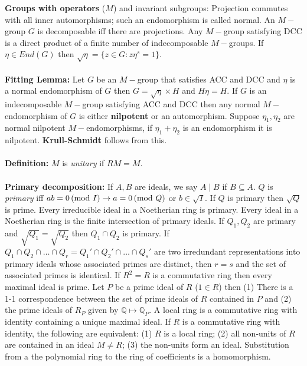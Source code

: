 {\bf Groups with operators} ($M$) and invariant subgroups:  Projection commutes with
all inner automorphisms; such an endomorphism is called normal.  An $M-$group
$G$ is decomposable 
iff there are projections.  Any $M-$group satisfying DCC is a direct
product of a finite number of indecomposable $M-$groups.  If $\eta \in  End(G)$
then ${\sqrt \eta}= \{z \in G: z \eta^s=1 \}$.
\\
\\
{\bf Fitting Lemma:}  Let $G$ be an $M-$group that satisfies ACC and DCC and $\eta$ is a
normal endomorphism of $G$ then $G= {\sqrt \eta} \times H$ and $H \eta = H$.
If $G$ is an indecomposable $M-$group satisfying ACC and DCC then any normal
$M-$endomorphism of $G$ is either {\bf nilpotent} or an automorphism.  Suppose
$\eta_1, \eta_2$ are normal nilpotent $M-$endomorphisms, if $\eta_1 + \eta_2$
is an endomorphism it is nilpotent.  {\bf Krull-Schmidt} follows
from this.  
\\
\\
{\bf Definition:} $M$ is \emph{unitary} if $RM=M$.  
\\
\\
{\bf Primary decomposition:}
If $A,B$ are ideals, we say $A \mid B$ if $B \subseteq A$. $Q$ is \emph{primary} iff
$ab= 0 \thinspace \textnormal{(mod } I \textnormal{)} \rightarrow a = 0 \thinspace \textnormal{(mod } Q \textnormal{)}$ or $b \in {\sqrt I}$.  If
$Q$ is primary then ${\sqrt Q}$ is prime.  
Every irreducible ideal in a Noetherian ring is primary.
Every ideal in a Noetherian ring is the finite intersection of
primary ideals.  If $Q_1, Q_2$ are primary and
${\sqrt {Q_1}}= {\sqrt {Q_2}}$ then $Q_1 \cap Q_2$ is primary.
If $Q_1 \cap Q_2 \cap \ldots \cap Q_r = Q_1' \cap Q_2' \cap \ldots \cap Q_s'$
are two irredundant representations into primary ideals whose associated primes
are distinct, then $r=s$ and the set of associated primes is identical.
If $R^2=R$ is a commutative ring then every maximal ideal is prime.  Let
$P$ be a prime ideal of $R$ ($1 \in R$) then (1)
There is a 1-1 correspondence between the set of prime ideals of $R$ contained
in $P$ and (2) the prime ideals of $R_P$ given by 
${\mathbb Q} \mapsto {\mathbb Q}_P$.  A local ring is a commutative ring
with identity containing a unique maximal ideal.  If $R$ is a commutative ring
with identity, the following are equivalent: (1) $R$ is a local ring; (2)
all non-units of $R$ are contained in an ideal 
$M \ne R$; (3)  the non-units form an ideal.
Substitution from a the polynomial ring to the ring of coefficients is a homomorphism.
\\
\\
